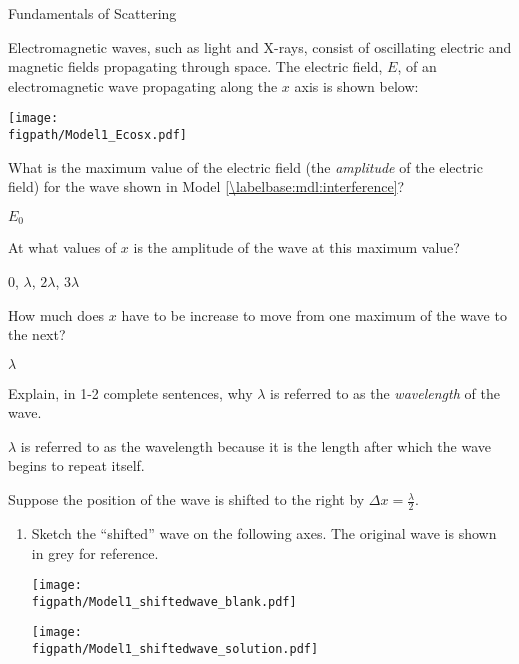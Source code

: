 \begin{activity}{Fundamentals of Scattering}
\begin{model}
	Electromagnetic waves, such as light and X-rays, consist of oscillating electric and magnetic fields propagating through space.
	The electric field, $E$, of an electromagnetic wave propagating along the $x$ axis is shown below:
	
	\vspace{6pt}
	\centerline{\texttt{[image: \\figpath/Model1\_Ecosx.pdf]}}
	
\end{model}


\begin{ctqs}

	\question What is the maximum value of the electric field (the \emph{amplitude} of the electric field) for the wave shown in Model \ref{\labelbase:mdl:interference}?
	
		\begin{solution}[0.25in]{}
			$E_0$
		\end{solution}
	
	\question At what values of $x$ is the amplitude of the wave at this maximum value?
	
		\begin{solution}[0.25in]{}
			0, $\lambda$, $2\lambda$, $3\lambda$
		\end{solution}
	
	\question How much does $x$ have to be increase to move from one maximum of the wave to the next?
	
		\begin{solution}[0.25in]{}
			$\lambda$
		\end{solution}
	
	\question Explain, in 1-2 complete sentences, why $\lambda$ is referred to as the \emph{wavelength} of the wave.
	
		\begin{solution}[1in]{}
			$\lambda$ is referred to as the wavelength because it is the length after which the wave begins to repeat itself.
		\end{solution}
	
	\clearpage
	\question Suppose the position of the wave is shifted to the right by $\Delta x = \frac{\lambda}{2}$.
	
		\begin{enumerate}
			\item Sketch the ``shifted'' wave on the following axes.  The original wave is shown in grey for reference.
	
				\begin{solution}[1.in]{
					\centerline{\texttt{[image: \\figpath/Model1\_shiftedwave\_blank.pdf]}}
				}
				\centerline{\texttt{[image: \\figpath/Model1\_shiftedwave\_solution.pdf]}}
				\end{solution}
			

\end{enumerate}
\end{ctqs}
\end{activity}
